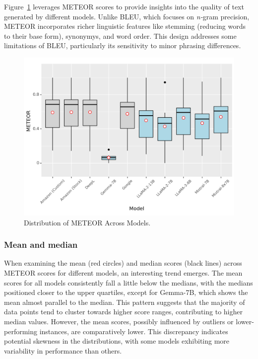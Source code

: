 Figure~\ref{fig: meteor-models} leverages METEOR scores to provide insights into the quality of text generated by different models. Unlike BLEU, which focuses on \emph{n-}gram precision, METEOR incorporates richer linguistic features like stemming (reducing words to their base form), synonymys, and word order. This design addresses some limitations of BLEU, particularly its sensitivity to minor phrasing differences.

\begin{figure}[htb]
        \centering
        \includegraphics[width=.9\textwidth]{textual/Figuras/Results/Unknown-90.png}
        \caption{Distribution of METEOR Across Models.}
        \label{fig: meteor-models}
\end{figure}


\subsubsection{Mean and median}

When examining the mean (red circles) and median scores (black lines) across METEOR scores for different models, an interesting trend emerges. The mean scores for all models consistently fall a little below the medians, with the medians positioned closer to the upper quartiles, except for Gemma-7B, which shows the mean almost parallel to the median. This pattern suggests that the majority of data points tend to cluster towards higher score ranges, contributing to higher median values. However, the mean scores, possibly influenced by outliers or lower-performing instances, are comparatively lower. This discrepancy indicates potential skewness in the distributions, with some models exhibiting more variability in performance than others.


